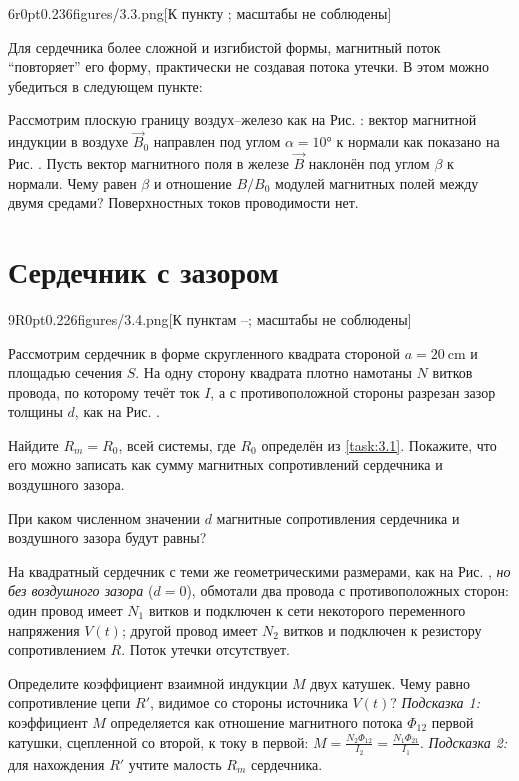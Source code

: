 \pic6r{0pt}{0.236}{figures/3.3.png}[К пункту ; масштабы не соблюдены]

Для сердечника более сложной и изгибистой формы, магнитный поток ``повторяет'' его форму, практически не создавая потока утечки. В этом можно убедиться в следующем пункте:
\begin{task}
    \item Рассмотрим плоскую границу воздух--железо как на Рис. : вектор магнитной индукции в воздухе $\vec B_0$ направлен под углом $\alpha=\ang{10}$ к нормали как показано на Рис. . Пусть вектор магнитного поля в железе $\vec B$ наклонён под углом $\beta$ к нормали. Чему равен $\beta$ и отношение $B/B_0$ модулей магнитных полей между двумя средами? Поверхностных токов проводимости нет.
\end{task}

\part{Сердечник с зазором}

\pic9R{0pt}{0.226}{figures/3.4.png}[К пунктам --; масштабы не соблюдены]

Рассмотрим сердечник в форме скругленного квадрата стороной $a=\qty{20}{\cm}$ и площадью сечения $S$. На одну сторону квадрата плотно намотаны $N$ витков провода, по которому течёт ток $I$, а с противоположной стороны разрезан зазор толщины $d$, как на Рис. .

\begin{task}
    \item Найдите $R_m=R_0$, всей системы, где $R_0$ определён из \eqref{task:3.1}. Покажите, что его можно записать как сумму магнитных сопротивлений сердечника и воздушного зазора.
\end{task}

\begin{task}
    \item При каком численном значении $d$ магнитные сопротивления сердечника и воздушного зазора будут равны?
\end{task}

На квадратный сердечник с теми же геометрическими размерами, как на Рис. , \textit{но без воздушного зазора} ($d=0$), обмотали два провода с противоположных сторон: один провод имеет $N_1$ витков и подключен к сети некоторого переменного напряжения $V(t)$; другой провод имеет $N_2$ витков и подключен к резистору сопротивлением $R$. Поток утечки отсутствует.
\begin{task}
    \item Определите коэффициент взаимной индукции $M$ двух катушек. Чему равно сопротивление цепи $R'$, видимое со стороны источника $V(t)$? \textit{Подсказка 1:} коэффициент $M$ определяется как отношение магнитного потока $\Phi_{12}$ первой катушки, сцепленной со второй, к току в первой: $M=\frac{N_2\Phi_{12}}{I_2}=\frac{N_1\Phi_{21}}{I_1}$. \textit{Подсказка 2:} для нахождения $R'$ учтите малость $R_m$ сердечника.
\end{task}

